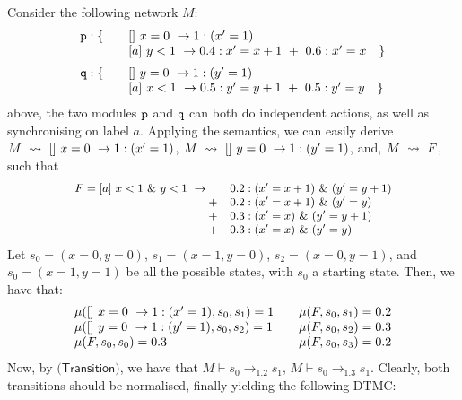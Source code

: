 \begin{example}
  Consider the following network $M$:
  \begin{displaymath}
    \begin{array}{llll}
      \role{p}: \{ & \quad \commandBase {}{x=0} {1:(x'=1)}\\
                   & \quad \commandBase {a}{y<1} {0.4: x'=x+1\ +\ 0.6: x'=x}\quad \}\\[2mm]
      \role{q}: \{ & \quad \commandBase {}{y=0} {1:(y'=1)}\\
                   & \quad \commandBase {a}{x<1} {0.5: y'=y+1\ +\ 0.5: y'=y}\quad \}\\
    \end{array}
  \end{displaymath}
  above, the two modules $\mathtt{p}$ and $\mathtt{q}$ can both do
  independent actions, as well as synchronising on label $a$. Applying
  the semantics, we can easily derive
  $M\ \stackrel{}{\rightsquigarrow}\ []\ x=0\ \rightarrow 1:(x'=1)$,
  $M\ \stackrel{}{\rightsquigarrow}\ []\ y=0\ \rightarrow 1:(y'=1)$, and, $M\ \stackrel{}{\rightsquigarrow}\ F$,
  such that
  \begin{displaymath}\small
    \begin{array}{rlll}
      F=\commandBase {a}{x<1\ \&\ y<1} {\quad} & 0.2: (x'=x+1)\ \&\ (y'=y+1)\\
                                       + & 0.2: (x'=x+1)\ \&\ (y'=y)\\
                                       + & 0.3: (x'=x)\ \&\ (y'=y+1)\\
                                       + & 0.3: (x'=x)\ \&\ (y'=y)\\
    \end{array}
  \end{displaymath}  
  Let $s_0=(x=0,y=0)$, $s_1=(x=1,y=0)$, $s_2=(x=0,y=1)$, and
  $s_0=(x=1,y=1)$ be all the possible states, with $s_0$ a starting
  state. Then,  we have that: 
  \begin{displaymath}
    \begin{array}{lr}
      \mu([]\ x=0\ \rightarrow 1:(x'=1), s_0, s_1) = 1 & \quad \mu(F, s_0, s_1) = 0.2\\
      \mu([]\ y=0\ \rightarrow 1:(y'=1), s_0, s_2) = 1 & \quad\mu(F, s_0, s_2) = 0.3\\ 
      \mu(F, s_0, s_0) = 0.3 & \quad\mu(F, s_0, s_3) = 0.2\\
    \end{array}
  \end{displaymath}  
  Now, by $\textsf{(Transition)}$, we have that
  $M\vdash s_0\rightarrow_{1.2} s_1$,
  $M\vdash s_0\rightarrow_{1.3} s_1$. Clearly, both transitions should
  be normalised, finally yielding the following DTMC:
\begin{comment}
  \begin{tikzpicture}\small
    \node[state, initial] (1) 
    {\tiny $s_0$};


\end{comment}
\end{example}
